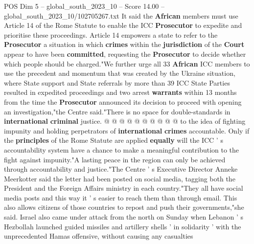 \begin{textsample}{POS Dim 5 – global\_south\_2023\_10 – Score 14.00 – global\_south\_2023\_10/102705267.txt}
It said the \textbf{African} members must use Article 14 of the Rome Statute to enable the ICC \textbf{Prosecutor} to expedite and prioritise these proceedings.
Article 14 empowers a state to refer to the \textbf{Prosecutor} a situation in which \textbf{crimes} within the \textbf{jurisdiction} of the \textbf{Court} appear to have been \textbf{committed}, requesting the \textbf{Prosecutor} to decide whether which people should be charged."We further urge all 33 \textbf{African} ICC members to use the precedent and momentum that was created by the Ukraine situation, where State support and State referrals by more than 39 ICC State Parties resulted in expedited proceedings and two arrest \textbf{warrants} within 13 months from the time the \textbf{Prosecutor} announced its decision to proceed with opening an investigation,"the Centre said."There is no space for double-standards in \textbf{international} \textbf{criminal} justice. @ @ @ @ @ @ @ @ @ @ to the idea of fighting impunity and holding perpetrators of \textbf{international} \textbf{crimes} accountable.
Only if the \textbf{principles} of the Rome Statute are applied \textbf{equally} will the ICC ' s accountability system have a chance to make a meaningful contribution to the fight against impunity."A lasting peace in the region can only be achieved through accountability and justice."The Centre ' s Executive Director Anneke Meerkotter said the letter had been posted on social media, tagging both the President and the Foreign Affairs ministry in each country."They all have social media posts and this way it ' s easier to reach them than through email.
This also allows citizens of those countries to repost and push their governments,"she said.
Israel also came under attack from the north on Sunday when Lebanon ' s Hezbollah launched guided missiles and artillery shells ' in solidarity ' with the unprecedented Hamas offensive, without causing any casualties

\end{textsample}
